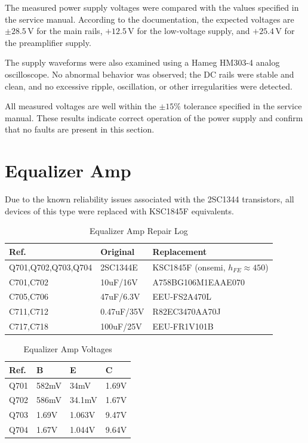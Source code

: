 \documentclass[]{article}
\begin{document}
The measured power supply voltages were compared with the values specified in the service manual. According to the documentation, the expected voltages are $\pm 28.5\,\mathrm{V}$ for the main rails, $+12.5\,\mathrm{V}$ for the low-voltage supply, and $+25.4\,\mathrm{V}$ for the preamplifier supply.

The supply waveforms were also examined using a Hameg HM303-4 analog oscilloscope. No abnormal behavior was observed; the DC rails were stable and clean, and no excessive ripple, oscillation, or other irregularities were detected.

All measured voltages are well within the $\pm 15\%$ tolerance specified in the service manual. These results indicate correct operation of the power supply and confirm that no faults are present in this section.

\section{Equalizer Amp}

Due to the known reliability issues associated with the 2SC1344 transistors, all devices of this type were replaced with KSC1845F equivalents.

\begin{table}[H]
	\centering
	\caption{Equalizer Amp Repair Log}
	\label{tab:eq_amp_log}
	\begin{tabular}{|l|l|l|}
		\hline
		\textbf{Ref.} & \textbf{Original} & \textbf{Replacement} \\
		\hline
		Q701,Q702,Q703,Q704 & 2SC1344E & KSC1845F (onsemi, $h_{FE} \approx 450$) \\
        \hline
        C701,C702 & 10uF/16V & A758BG106M1EAAE070 \\
        \hline
        C705,C706 & 47uF/6.3V & EEU-FS2A470L \\
        \hline
        C711,C712 & 0.47uF/35V & R82EC3470AA70J \\
        \hline
        C717,C718 & 100uF/25V & EEU-FR1V101B \\
        \hline
	\end{tabular}
\end{table}

\begin{table}[H]
	\centering
	\caption{Equalizer Amp Voltages}
	\label{tab:eq_amp_voltages}
	\begin{tabular}{|l|l|l|l|}
    \hline
 \textbf{Ref.} & \textbf{B} & \textbf{E} & \textbf{C} \\
    \hline
    Q701 & 582mV  & 34mV  & 1.69V   \\
    \hline
    Q702 & 586mV   & 34.1mV  & 1.67V  \\
    \hline
    Q703 & 1.69V  &  1.063V  & 9.47V  \\
    \hline
    Q704 & 1.67V  & 1.044V  & 9.64V   \\
    \hline
	\end{tabular}
\end{table}
\end{document}
